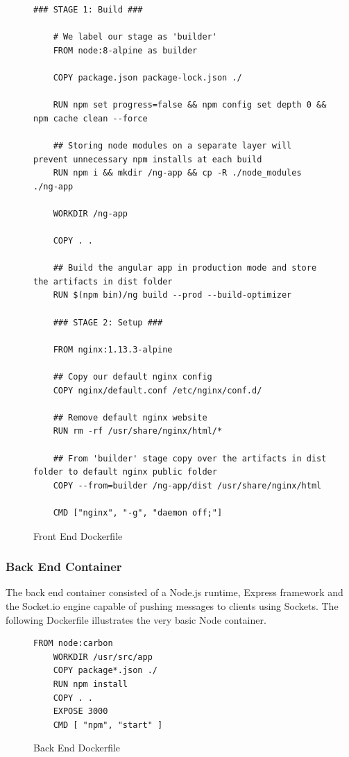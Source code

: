 \begin{figure}[ht]
  \begin{lstlisting}[basicstyle=\tiny]
    ### STAGE 1: Build ###

    # We label our stage as 'builder'
    FROM node:8-alpine as builder

    COPY package.json package-lock.json ./

    RUN npm set progress=false && npm config set depth 0 && npm cache clean --force

    ## Storing node modules on a separate layer will prevent unnecessary npm installs at each build
    RUN npm i && mkdir /ng-app && cp -R ./node_modules ./ng-app

    WORKDIR /ng-app

    COPY . .

    ## Build the angular app in production mode and store the artifacts in dist folder
    RUN $(npm bin)/ng build --prod --build-optimizer

    ### STAGE 2: Setup ###

    FROM nginx:1.13.3-alpine

    ## Copy our default nginx config
    COPY nginx/default.conf /etc/nginx/conf.d/

    ## Remove default nginx website
    RUN rm -rf /usr/share/nginx/html/*

    ## From 'builder' stage copy over the artifacts in dist folder to default nginx public folder
    COPY --from=builder /ng-app/dist /usr/share/nginx/html

    CMD ["nginx", "-g", "daemon off;"]
  \end{lstlisting}
  \caption{Front End Dockerfile}
\end{figure}

\subsubsection{Back End Container}
The back end container consisted of a Node.js runtime, Express framework and the Socket.io
engine capable of pushing messages to clients using Sockets. The following Dockerfile illustrates
the very basic Node container.

\begin{figure}[ht]
    \begin{lstlisting}[basicstyle=\small]
    FROM node:carbon
    WORKDIR /usr/src/app
    COPY package*.json ./
    RUN npm install
    COPY . .
    EXPOSE 3000
    CMD [ "npm", "start" ]
  \end{lstlisting}
  \caption{Back End Dockerfile}
\end{figure}

